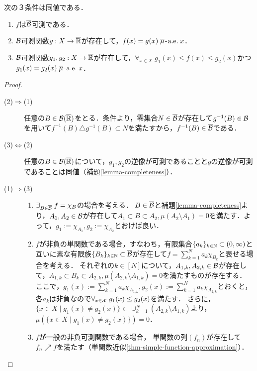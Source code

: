 \documentclass[uplatex, dvipdfmx]{jsreport}
\begin{document}
\begin{proposition}[完備化可測性の特徴付け]\label{prop-characterization-of-measurability-on-complete-space}
    次の３条件は同値である．
    \begin{enumerate}
        \item $f$は$\overline{\mathcal{B}}$可測である．
        \item $\mathcal{B}$可測関数$g:X\to\overline{\mathbb{R}}$が存在して，$f(x)=g(x)\;\overline{\mu}$-$\mathrm{a.e.}\; x$．
        \item $\mathcal{B}$可測関数$g_1,g_2:X\to\overline{\mathbb{R}}$が存在して，$\forall_{x\in X}\;g_1(x)\le f(x)\le g_2(x)$かつ$g_1(x)=g_2(x)\;\overline{\mu}$-$\mathrm{a.e.}\; x$．
    \end{enumerate}
\end{proposition}
\begin{proof}\mbox{}
    \begin{description}
        \item[(2)$\Rightarrow$(1)] 任意の$B\in\mathcal{B}(\overline{\mathbb{R}})$をとる．条件より，零集合$N\in\overline{\mathcal{B}}$が存在して$g^{-1}(B)\in\mathcal{B}$を用いて$f^{-1}(B)\triangle g^{-1}(B)\subset N$を満たすから，$f^{-1}(B)\in\overline{\mathcal{B}}$である．
        \item[(3)$\Leftrightarrow$(2)] 任意の$B\in\mathcal{B}(\overline{\mathbb{R}})$について，$g_1,g_2$の逆像が可測であることと$g$の逆像が可測であることは同値（補題\ref{lemma-completeness}）．
        \item[(1)$\Rightarrow$(3)] \begin{enumerate}
            \item $\exists_{B\in\overline{\mathcal{B}}}\;f=\chi_B$の場合を考える．
            $B\in\overline{\mathcal{B}}$と補題\ref{lemma-completeness}より，$A_1,A_2\in\mathcal{B}$が存在して$A_1\subset B\subset A_2,\mu(A_2\setminus A_1)=0$を満たす．よって，$g_1:=\chi_{A_1},g_2:=\chi_{A_2}$とおけば良い．
            \item $f$が非負の単関数である場合，すなわち，有限集合$\{a_k\}_{k\in\mathbb{N}}\subset(0,\infty)$と互いに素な有限族$\{B_k\}_{k\in\mathbb{N}}\subset\overline{\mathcal{B}}$が存在して$f=\sum^N_{k=1}a_k\chi_{B_k}$と表せる場合を考える．
            それぞれの$k\in[N]$について，$A_{1,k},A_{2,k}\in\mathcal{B}$が存在して，$A_{1,k}\subset B_k\subset A_{2,k},\mu(A_{2,k}\setminus A_{1,k})=0$を満たすものが存在する．
            ここで，$g_1(x):=\sum^N_{k=1}a_k\chi_{A_{1,k}},g_2(x):=\sum^N_{k=1}a_k\chi_{A_{2,k}}$とおくと，各$a_k$は非負なので$\forall_{x\in\mathcal{X}}\;g_1(x)\le g_2(x)$を満たす．
            さらに，$\{x\in X\mid g_1(x)\ne g_2(x)\}\subset\cup^N_{k=1}(A_{2,k}\setminus A_{1,k})$より，$\mu(\{x\in X\mid g_1(x)\ne g_2(x)\})=0$．
            \item $f$が一般の非負可測関数である場合，
            単関数の列$(f_n)$が存在して$f_n\nearrow f$を満たす（単関数近似\ref{thm-simple-function-approximation}）．

\end{enumerate}
\end{description}
\end{proof}
\end{document}
